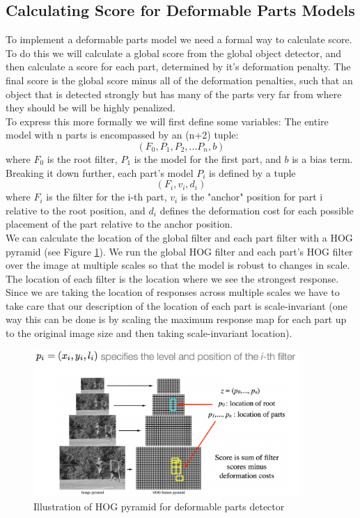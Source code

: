 \documentclass{article}
\begin{document}
\subsection{Calculating Score for Deformable Parts Models}

To implement a deformable parts model we need a formal way to calculate score. To do
this we will calculate a global score from the global object detector, and then
calculate a score for each part, determined by it's deformation penalty. The final
score is the global score minus all of the deformation penalties, such that an object
that is detected strongly but has many of the parts very far from where they should be will be highly penalized.\\

To express this more formally we will first define some variables: The entire model with n parts is
encompassed by an (n+2) tuple: $$(F_0, P_1, P_2, ... P_n, b)$$
where $F_0$ is the root filter, $P_1$ is the model for the first part, and $b$ is a 
bias term. Breaking it down further, each part's model $P_i$ is defined by a tuple
$$(F_i, v_i, d_i)$$
where $F_i$ is the filter for the i-th part, $v_i$ is the "anchor" position for part
i relative to the root position, and $d_i$ defines the deformation cost for each
possible placement of the part relative to the anchor position.\\


We can calculate the location of the global filter and each part filter
with a HOG pyramid (see Figure \ref{fig:deformable_score1}). We run the global HOG
filter
and each part's HOG filter over the image at multiple scales so that the model is 
robust
to changes in scale. The location of each filter is the location where we see the
strongest response. Since we are taking the location of responses across multiple
scales we have to take care that our description of the location of each part is
scale-invariant (one way this can be done is by scaling the maximum response map for 
each part up to the original image size and then taking scale-invariant location).\\

\begin{figure}[h]
	\center
	\includegraphics[width=0.9\textwidth]{deformable_score1.png}
    \caption{Illustration of HOG pyramid for deformable parts detector}
    \label{fig:deformable_score1}
\end{figure}
\end{document}

